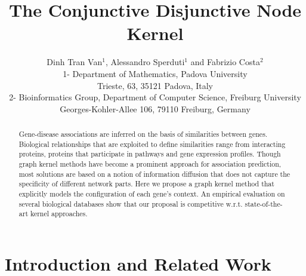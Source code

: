 \documentclass{esannV2}
\begin{document}
\title{The Conjunctive Disjunctive Node Kernel}

\author{Dinh Tran Van$^1$, Alessandro Sperduti$^1$ and Fabrizio Costa$^2$
%
%
\vspace{.3cm}\\
%
1- Department of Mathematics, Padova University\\
Trieste, 63, 35121 Padova, Italy
%
\vspace{.1cm}\\
2- Bioinformatics Group, Department of Computer Science, Freiburg University \\
Georges-Kohler-Allee 106, 79110 Freiburg, Germany\\
}

\maketitle

\begin{abstract} Gene-disease associations are inferred on the basis of
similarities between genes. Biological relationships that are exploited to
define similarities range from interacting proteins, proteins that participate
in pathways and gene expression profiles. Though graph kernel methods have
become a prominent approach for association prediction, most solutions are
based on a notion of information diffusion that does not capture the
specificity of different network parts. Here we propose a graph kernel method that
explicitly models the configuration of each gene's context. An empirical
evaluation on several biological databases show that our proposal is
competitive w.r.t. state-of-the-art kernel approaches.

\end{abstract}

\section{Introduction and Related Work} \label{introduction} 
\end{document}
